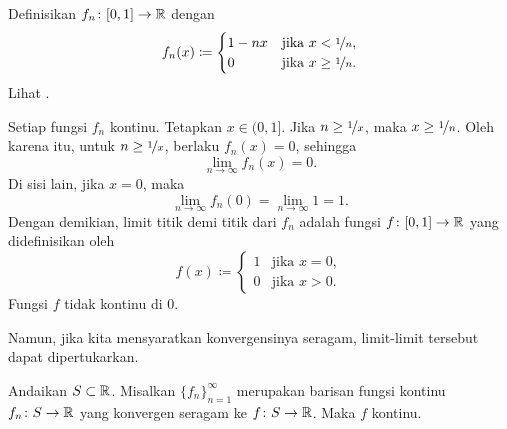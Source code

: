 \begin{example}
Definisikan $f_n \colon [0,1] \to {\mathbb{R}}$ dengan
\begin{equation*}
f_n(x) \coloneqq
\begin{cases}
1-nx &  \text{jika } x < \nicefrac{1}{n},\\
0 &  \text{jika } x \geq \nicefrac{1}{n}.
\end{cases}
\end{equation*}
Lihat .

\begin{myfigureht}
\caption{Grafik $f_n(x)$.%
\label{contconvcntr:fig}}
\end{myfigureht}

Setiap fungsi $f_n$ kontinu.
Tetapkan $x \in (0,1]$.  Jika $n \geq \nicefrac{1}{x}$,
maka $x \geq \nicefrac{1}{n}$.  Oleh karena itu, untuk $n \geq \nicefrac{1}{x}$,
berlaku $f_n(x) = 0$, sehingga
\begin{equation*}
\lim_{n \to \infty} f_n(x) = 0.
\end{equation*}
Di sisi lain, jika $x=0$, maka
\begin{equation*}
\lim_{n \to \infty} f_n(0) = 
\lim_{n \to \infty} 1 = 1.
\end{equation*}
Dengan demikian, limit titik demi titik dari $f_n$ adalah fungsi
$f \colon [0,1] \to {\mathbb{R}}$ yang didefinisikan oleh
\begin{equation*}
f(x) \coloneqq
\begin{cases}
1 &  \text{jika } x = 0,\\
0 &  \text{jika } x > 0.
\end{cases}
\end{equation*}
Fungsi $f$ tidak kontinu di 0.
\end{example}

Namun, jika kita mensyaratkan konvergensinya seragam, limit-limit tersebut dapat
dipertukarkan.

\begin{thm}
Andaikan $S \subset {\mathbb{R}}$.
Misalkan $\{ f_n \}_{n=1}^\infty$ merupakan
barisan fungsi kontinu $f_n \colon S \to {\mathbb{R}}$ yang konvergen
seragam ke $f \colon S \to {\mathbb{R}}$.  Maka $f$ kontinu.
\end{thm}

